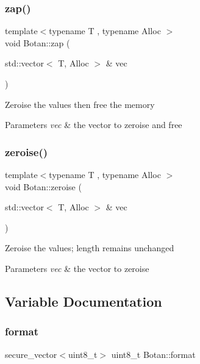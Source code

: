 \subsubsection{\texorpdfstring{zap()}{zap()}}
{\footnotesize\ttfamily template$<$typename T , typename Alloc $>$ \\
void Botan\+::zap (\begin{DoxyParamCaption}\item[{std\+::vector$<$ T, Alloc $>$ \&}]{vec }\end{DoxyParamCaption})}

Zeroise the values then free the memory 
\begin{DoxyParams}{Parameters}
{\em vec} & the vector to zeroise and free \\
\hline
\end{DoxyParams}
\mbox{\label{namespace_botan_a09ce987463cc4e1b7682f31bb486fdb1}} 
\subsubsection{\texorpdfstring{zeroise()}{zeroise()}}
{\footnotesize\ttfamily template$<$typename T , typename Alloc $>$ \\
void Botan\+::zeroise (\begin{DoxyParamCaption}\item[{std\+::vector$<$ T, Alloc $>$ \&}]{vec }\end{DoxyParamCaption})}

Zeroise the values; length remains unchanged 
\begin{DoxyParams}{Parameters}
{\em vec} & the vector to zeroise \\
\hline
\end{DoxyParams}


\subsection{Variable Documentation}
\mbox{\label{namespace_botan_a84160e8d4f120a4f232bf20ecb80be0e}} 
\subsubsection{\texorpdfstring{format}{format}}
{\footnotesize\ttfamily secure\+\_\+vector$<$uint8\+\_\+t$>$ uint8\+\_\+t Botan\+::format}

